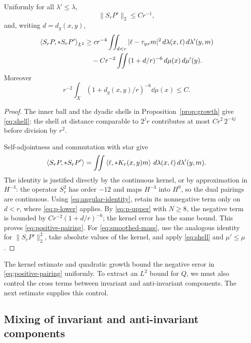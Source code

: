 \begin{lemma}\label{lem:positive-pairing}
Uniformly for all \(\lambda'\le\lambda\),
\begin{equation}\label{eq:smoothed-mass}
\|S_rP'\|_2\le Cr^{-1},
\end{equation}
and, writing \(d=d_g(x,y)\),
\begin{align}
\left\langle S_rP,*S_rP'\right\rangle_{L^2}
&\ge cr^{-4}\iint_{d<r}
|\ell-\tau_{yx}m|^2\,d\lambda(x,\ell)\,d\lambda'(y,m)
\nonumber\\
&\quad-Cr^{-2}\iint(1+d/r)^{-6}\,d\mu(x)\,d\mu'(y).
\label{eq:positive-pairing}
\end{align}
Moreover
\begin{equation}\label{eq:shell}
r^{-2}\int_X(1+d_g(x,y)/r)^{-6}\dd\mu(x)\le C.
\end{equation}
\end{lemma}

\begin{proof}
The inner ball and the dyadic shells in
Proposition~\ref{prop:growth} give \eqref{eq:shell}:
the shell at distance comparable to \(2^jr\) contributes
at most \(Cr^2\,2^{-4j}\) before division by \(r^2\).

Self-adjointness and commutation with star give
\[
\left\langle S_rP,*S_rP'\right\rangle=
\iint\left\langle \ell,*K_r(x,y)m\right\rangle
\,d\lambda(x,\ell)\,d\lambda'(y,m).
\]
The identity is justified directly by the continuous kernel,
or by approximation in \(H^{-3}\): the operator \(S_r^2\)
has order \(-12\) and maps \(H^{-3}\) into \(H^9\),
so the dual pairings are continuous. Using
\eqref{eq:angular-identity}, retain its nonnegative term
only on \(d<r\), where \eqref{eq:p-lower} applies.
By \eqref{eq:p-upper} with \(N\ge8\), the negative term
is bounded by
\(Cr^{-2}(1+d/r)^{-6}\); the kernel error has the same
bound. This proves \eqref{eq:positive-pairing}.
For \eqref{eq:smoothed-mass}, use the analogous identity
for \(\|S_rP'\|_2^2\), take absolute values of the kernel,
and apply \eqref{eq:shell} and \(\mu'\le\mu\).
\end{proof}

The kernel estimate and quadratic growth bound the negative error
in \eqref{eq:positive-pairing} uniformly. To extract an \(L^2\)
bound for \(Q\), we must also control the cross terms between
invariant and anti-invariant components. The next estimate
supplies this control.

\subsection{Mixing of invariant and anti-invariant components}

